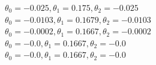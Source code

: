 \documentclass[11pt]{article} %
\begin{document}
\begin{figure}[h]
\qquad
{}
\end{figure}
\(\theta_0 = -0.025, \theta_1= 0.175 , \theta_2= -0.025\)\\
\(\theta_0= -0.0103, \theta_1= 0.1679 , \theta_2 =-0.0103\)\\
\(\theta_0 =-0.0002, \theta_1= 0.1667 , \theta_2 =-0.0002\)\\
\(\theta_0 =-0.0, \theta_1 =0.1667 , \theta_2 =-0.0\)\\
\(\theta_0 =-0.0, \theta_1= 0.1667 , \theta_2 =-0.0\)\\
\end{document}
